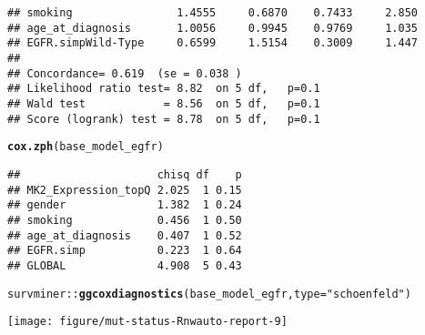 \documentclass{article}\usepackage[]{graphicx}\usepackage[]{color}
\makeatletter
\newcommand{\hlstr}[1]{\textcolor[rgb]{0.192,0.494,0.8}{#1}}%
\newcommand{\hlopt}[1]{\textcolor[rgb]{0,0,0}{#1}}%
\newcommand{\hlstd}[1]{\textcolor[rgb]{0.345,0.345,0.345}{#1}}%
\newcommand{\hlkwc}[1]{\textcolor[rgb]{0.333,0.667,0.333}{#1}}%
\newcommand{\hlkwd}[1]{\textcolor[rgb]{0.737,0.353,0.396}{\textbf{#1}}}%
\newenvironment{kframe}{%
 \def\at@end@of@kframe{}%
 \ifinner\ifhmode%
  \def\at@end@of@kframe{\end{minipage}}%
  \begin{minipage}{\columnwidth}%
 \fi\fi%
 \def\FrameCommand##1{\hskip\@totalleftmargin \hskip-\fboxsep
 \colorbox{shadecolor}{##1}\hskip-\fboxsep
     \hskip-\linewidth \hskip-\@totalleftmargin \hskip\columnwidth}%
 \MakeFramed {\advance\hsize-\width
   \@totalleftmargin\z@ \linewidth\hsize
   \@setminipage}}%
 {\par\unskip\endMakeFramed%
 \at@end@of@kframe}
\newenvironment{knitrout}{}{} %
\makeatother
\begin{document}
\begin{knitrout}
\begin{kframe}
\begin{verbatim}
## smoking                1.4555     0.6870    0.7433     2.850
## age_at_diagnosis       1.0056     0.9945    0.9769     1.035
## EGFR.simpWild-Type     0.6599     1.5154    0.3009     1.447
## 
## Concordance= 0.619  (se = 0.038 )
## Likelihood ratio test= 8.82  on 5 df,   p=0.1
## Wald test            = 8.56  on 5 df,   p=0.1
## Score (logrank) test = 8.78  on 5 df,   p=0.1
\end{verbatim}
\begin{alltt}
  \hlkwd{cox.zph}\hlstd{(base_model_egfr)}
\end{alltt}
\begin{verbatim}
##                     chisq df    p
## MK2_Expression_topQ 2.025  1 0.15
## gender              1.382  1 0.24
## smoking             0.456  1 0.50
## age_at_diagnosis    0.407  1 0.52
## EGFR.simp           0.223  1 0.64
## GLOBAL              4.908  5 0.43
\end{verbatim}
\begin{alltt}
\hlstd{survminer}\hlopt{::}\hlkwd{ggcoxdiagnostics}\hlstd{(base_model_egfr,} \hlkwc{type}\hlstd{=}\hlstr{"schoenfeld"}\hlstd{)}
\end{alltt}


{\ttfamily\noindent\itshape{}}\end{kframe}

{\centering \texttt{[image: figure/mut-status-Rnwauto-report-9]} 

}



\end{knitrout}
\end{document}
